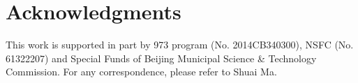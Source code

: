 \documentclass[10pt,journal,compsoc]{IEEEtran}
\begin{document}



\section*{Acknowledgments}
This work is supported in part by  973 program ({\small No. 2014CB340300}), NSFC ({\small No. 61322207}) and Special Funds of Beijing Municipal Science \& Technology Commission. For any correspondence, please refer to Shuai Ma.









\end{document}
